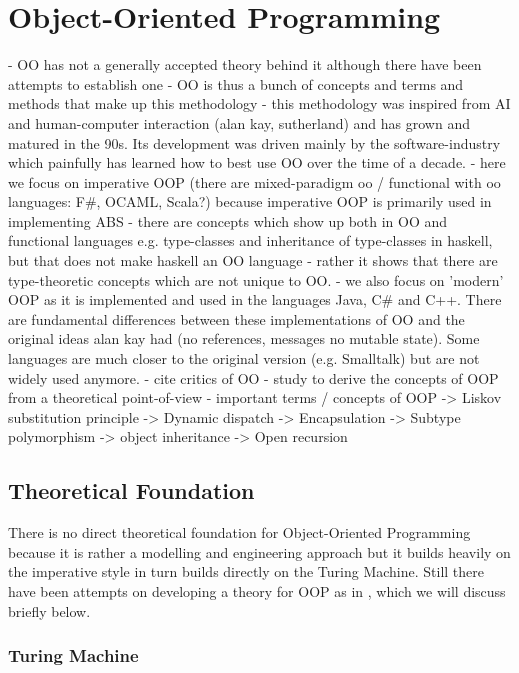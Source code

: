 \chapter{Object-Oriented Programming}
- OO has not a generally accepted theory behind it although there have been attempts to establish one \cite{abadi_theory_1996}
- OO is thus a bunch of concepts and terms and methods that make up this methodology - this methodology was inspired from AI and human-computer interaction (alan kay, sutherland) and has grown and matured in the 90s. Its development was driven mainly by the software-industry which painfully has learned how to best use OO over the time of a decade.
- here we focus on imperative OOP (there are mixed-paradigm oo / functional with oo languages: F\#, OCAML, Scala?) because imperative OOP is primarily used in implementing ABS
- there are concepts which show up both in OO and functional languages e.g. type-classes and inheritance of type-classes in haskell, but that does not make haskell an OO language - rather it shows that there are type-theoretic concepts which are not unique to OO.
- we also focus on 'modern' OOP as it is implemented and used in the languages Java, C\# and C++. There are fundamental differences between these implementations of OO and the original ideas alan kay had (no references, messages no mutable state). Some languages are much closer to the original version (e.g. Smalltalk) but are not widely used anymore.
- cite critics of OO
- study \cite{abadi_theory_1996} to derive the concepts of OOP from a theoretical point-of-view
- important terms / concepts of OOP
	-> Liskov substitution principle
	-> Dynamic dispatch
	-> Encapsulation
	-> Subtype polymorphism
	-> object inheritance 
	-> Open recursion
	


\section{Theoretical Foundation}
There is no direct theoretical foundation for Object-Oriented Programming because it is rather a modelling and engineering approach but it builds heavily on the imperative style in turn builds directly on the Turing Machine. Still there have been attempts on developing a theory for OOP as in \cite{abadi_theory_1996}, which we will discuss briefly below.

\subsection{Turing Machine}
\cite{webber_formal_2008}

